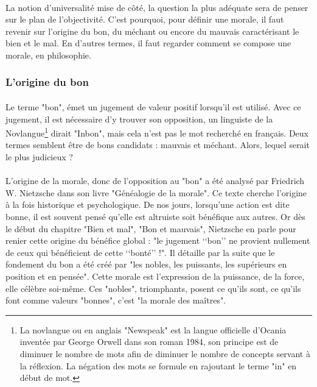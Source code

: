 \documentclass[10pt, french, a4paper]{article}
\begin{document}
\paragraph{}
La notion d’universalité mise de côté, la question la plus adéquate sera de penser sur le plan de l’objectivité. C'est pourquoi, pour définir une morale, il faut revenir sur l'origine du bon, du méchant ou encore du mauvais caractérisant le bien et le mal. En d'autres termes, il faut regarder comment se compose une morale, en philosophie.

\subsubsection{L'origine du bon}
\label{subsec:ethique_origine_bon}

\paragraph{}
Le terme "bon", émet un jugement de valeur positif lorsqu’il est utilisé. Avec ce jugement, il est nécessaire d’y trouver son opposition, un linguiste de la Novlangue\footnote{La novlangue ou en anglais "Newspeak" est la langue officielle d’Ocania inventée par George Orwell dans son roman 1984, son principe est de diminuer le nombre de mots afin de diminuer le nombre de concepts servant à la réflexion. La négation des mots se formule en rajoutant le terme "in" en début de mot.} dirait "Inbon", mais cela n’est pas le mot recherché en français. Deux termes semblent être de bons candidats : mauvais et méchant. Alors, lequel serait le plus judicieux ?

\paragraph{}
L’origine de la morale, donc de l’opposition au "bon" a été analysé par Friedrich W. Nietzsche \citep{nietzsche_genealogie_1900} dans son livre "Généalogie de la morale". Ce texte cherche l’origine à la fois historique et psychologique. De nos jours, lorsqu’une action est dite bonne, il est souvent pensé qu’elle est altruiste soit bénéfique aux autres. Or dès le début du chapitre "Bien et mal", "Bon et mauvais", Nietzsche en parle pour renier cette origine du bénéfice global : "le jugement ‘‘bon’’ ne provient nullement de ceux qui bénéficient de cette ‘‘bonté’’ !". Il détaille par la suite que le fondement du bon a été créé par "les nobles, les puissants, les supérieurs en position et en pensée". Cette morale est l’expression de la puissance, de la force, elle célèbre soi-même. Ces "nobles", triomphants, posent ce qu’ils sont, ce qu’ils font comme valeurs "bonnes", c’est "la morale des maîtres".
\end{document}
